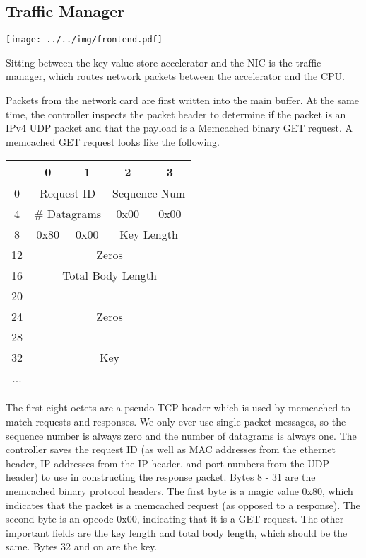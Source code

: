 \subsection{Traffic Manager}

\texttt{[image: ../../img/frontend.pdf]}

Sitting between the key-value store accelerator and the NIC is the traffic
manager, which routes network packets between the accelerator and the CPU.

Packets from the network card are first written into the main buffer.
At the same time, the controller inspects the packet header to determine if
the packet is an IPv4 UDP packet and that the payload is a Memcached binary
GET request. A memcached GET request looks like the following.

\begin{center}
    \begin{tabular}{|c|c|c|c|c|}
        \hline
          & 0 & 1 & 2 & 3 \\
        \hline
        0 & \multicolumn{2}{|c}{Request ID} & \multicolumn{2}{|c|}{Sequence Num} \\
        \hline
        4 & \multicolumn{2}{|c|}{\# Datagrams} & 0x00 & 0x00 \\
        \hline
        8 & 0x80 & 0x00 & \multicolumn{2}{c|}{Key Length} \\
        \hline
        12 & \multicolumn{4}{|c|}{Zeros} \\
        \hline
        16 & \multicolumn{4}{|c|}{Total Body Length} \\
        \hline
        20 & \multicolumn{4}{|c|}{\multirow{3}{*}{Zeros}} \\
        \cline{1-1}
        24 & \multicolumn{4}{|c|}{} \\
        \cline{1-1}
        28 & \multicolumn{4}{|c|}{} \\
        \hline
        32 & \multicolumn{4}{|c|}{Key} \\
        ... & \multicolumn{4}{|c|}{} \\
        \hline
    \end{tabular}
\end{center}

The first eight octets are a pseudo-TCP header which is used by memcached to
match requests and responses. We only ever use single-packet messages,
so the sequence number is always zero and the number of datagrams is 
always one. The controller saves the request ID (as well as MAC addresses
from the ethernet header, IP addresses from the IP header, and port numbers
from the UDP header) to use in constructing the response packet.
Bytes 8 - 31 are the memcached binary protocol headers. The first byte is a
magic value 0x80, which indicates that the packet is a memcached request
(as opposed to a response). The second byte is an opcode 0x00, indicating that
it is a GET request. The other important fields are the key length and total
body length, which should be the same. Bytes 32 and on are the key.

